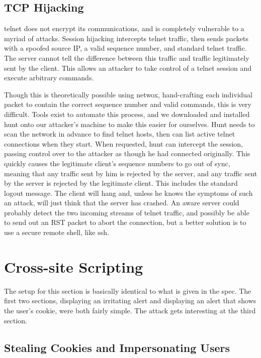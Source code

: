 \subsection{TCP Hijacking}

telnet does not encrypt its communications, and is completely vulnerable to a myriad of attacks. Session hijacking
intercepts telnet traffic, then sends packets with a spoofed source IP, a valid sequence number, and standard telnet
traffic. The server cannot tell the difference between this traffic and traffic legitimately sent by the client. This
allows an attacker to take control of a telnet session and execute arbitrary commands.

Though this is theoretically possible using netwox, hand-crafting each individual packet to contain the correct sequence
number and valid commands, this is very difficult. Tools exist to automate this process, and we downloaded and installed
hunt onto our attacker's machine to make this easier for ourselves. Hunt needs to scan the network in advance to find
telnet hosts, then can list active telnet connections when they start. When requested, hunt can intercept the session,
passing control over to the attacker as though he had connected originally. This quickly causes the legitimate client's
sequence numbers to go out of sync, meaning that any traffic sent by him is rejected by the server, and any traffic sent
by the server is rejected by the legitimate client. This includes the standard logout message. The client will hang and,
unless he knows the symptoms of such an attack, will just think that the server has crashed. An aware server could
probably detect the two incoming streams of telnet traffic, and possibly be able to send out an RST packet to abort the
connection, but a better solution is to use a secure remote shell, like ssh.


\section{Cross-site Scripting}

The setup for this section is basically identical to what is given in the spec. The first two sections, displaying an
irritating alert and displaying an alert that shows the user's cookie, were both fairly simple. The attack gets
interesting at the third section.

\subsection{Stealing Cookies and Impersonating Users}

